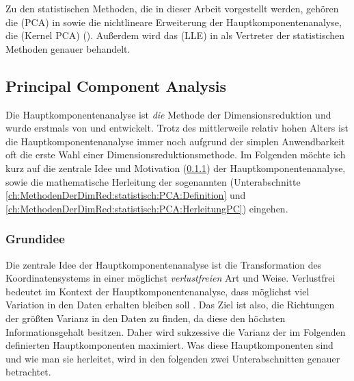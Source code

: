 Zu den statistischen Methoden, die in dieser Arbeit vorgestellt werden, gehören die
 (PCA) in  sowie
die nichtlineare Erweiterung der Hauptkomponentenanalyse, die  (Kernel PCA) (). Außerdem wird das
 (LLE) in  als
Vertreter der statistischen Methoden genauer behandelt.

\subsection{Principal Component Analysis}
\label{ch:MethodenDerDimRed:statistisch:PCA}

Die Hauptkomponentenanalyse ist \textit{die} Methode der Dimensionsreduktion und wurde erstmals von
\textcite{Pearson.1901} und \textcite{Hotelling.1933} entwickelt. Trotz des mittlerweile relativ
hohen Alters ist die Hauptkomponentenanalyse immer noch aufgrund der simplen Anwendbarkeit oft die
erste Wahl einer Dimensionsreduktionsmethode. Im Folgenden möchte ich kurz auf die zentrale Idee
und Motivation (\ref{ch:MethodenDerDimRed:statistisch:PCA:Grundidee}) der Hauptkomponentenanalyse,
sowie die mathematische Herleitung der sogenannten  (Unterabschnitte
\ref{ch:MethodenDerDimRed:statistisch:PCA:Definition} und
\ref{ch:MethodenDerDimRed:statistisch:PCA:HerleitungPC}) eingehen.

\subsubsection{Grundidee}
\label{ch:MethodenDerDimRed:statistisch:PCA:Grundidee}
Die zentrale Idee der Hauptkomponentenanalyse ist die Transformation des Koordinatensystems in einer möglichst \textit{verlustfreien} Art und Weise. Verlustfrei bedeutet im Kontext der Hauptkomponentenanalyse, dass möglichst viel Variation in den Daten erhalten bleiben soll \parencite[vgl.][1]{Jolliffe.2002}. Das Ziel ist also, die Richtungen der größten Varianz in den Daten
zu finden, da diese den höchsten Informationsgehalt besitzen. Daher wird sukzessive die Varianz der
im Folgenden definierten Hauptkomponenten maximiert. Was diese Hauptkomponenten sind und wie man
sie herleitet, wird in den folgenden zwei Unterabschnitten genauer betrachtet.

